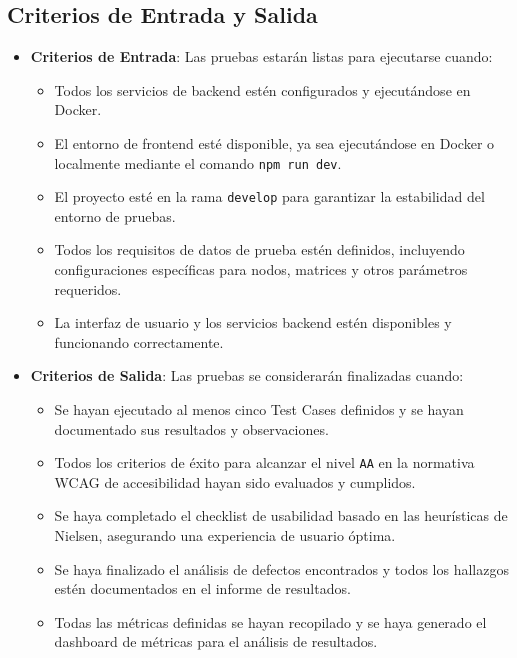 \documentclass[stu, 12pt, letterpaper, donotrepeattitle, floatsintext, natbib]{apa7}
\begin{document}
\subsection{Criterios de Entrada y Salida}
\begin{itemize}
    \item \textbf{Criterios de Entrada}: Las pruebas estarán listas para ejecutarse cuando:
    \begin{itemize}
        \item Todos los servicios de backend estén configurados y ejecutándose en Docker.
        \item El entorno de frontend esté disponible, ya sea ejecutándose en Docker o localmente mediante el comando \texttt{npm run dev}.
        \item El proyecto esté en la rama \texttt{develop} para garantizar la estabilidad del entorno de pruebas.
        \item Todos los requisitos de datos de prueba estén definidos, incluyendo configuraciones específicas para nodos, matrices y otros parámetros requeridos.
        \item La interfaz de usuario y los servicios backend estén disponibles y funcionando correctamente.
    \end{itemize}
    
    \item \textbf{Criterios de Salida}: Las pruebas se considerarán finalizadas cuando:
    \begin{itemize}
        \item Se hayan ejecutado al menos cinco Test Cases definidos y se hayan documentado sus resultados y observaciones.
        \item Todos los criterios de éxito para alcanzar el nivel \texttt{AA} en la normativa WCAG de accesibilidad hayan sido evaluados y cumplidos.
        \item Se haya completado el checklist de usabilidad basado en las heurísticas de Nielsen, asegurando una experiencia de usuario óptima.
        \item Se haya finalizado el análisis de defectos encontrados y todos los hallazgos estén documentados en el informe de resultados.
        \item Todas las métricas definidas se hayan recopilado y se haya generado el dashboard de métricas para el análisis de resultados.
    \end{itemize}
\end{itemize}
\end{document}
